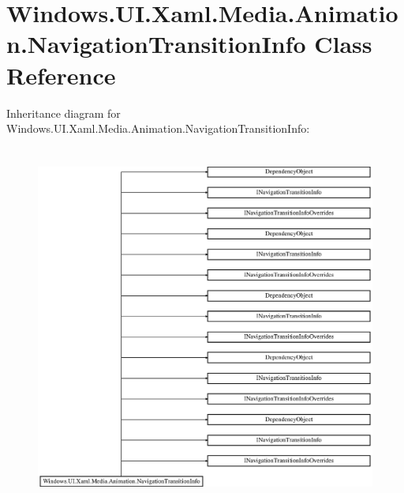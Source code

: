 \hypertarget{class_windows_1_1_u_i_1_1_xaml_1_1_media_1_1_animation_1_1_navigation_transition_info}{}\section{Windows.\+U\+I.\+Xaml.\+Media.\+Animation.\+Navigation\+Transition\+Info Class Reference}
\label{class_windows_1_1_u_i_1_1_xaml_1_1_media_1_1_animation_1_1_navigation_transition_info}
Inheritance diagram for Windows.\+U\+I.\+Xaml.\+Media.\+Animation.\+Navigation\+Transition\+Info\+:\begin{figure}[H]
\begin{center}
\leavevmode
\includegraphics[height=12.000000cm]{class_windows_1_1_u_i_1_1_xaml_1_1_media_1_1_animation_1_1_navigation_transition_info}
\end{center}
\end{figure}
